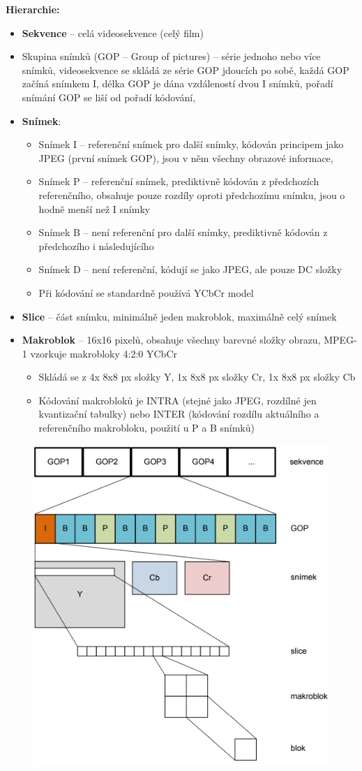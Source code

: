\textbf{Hierarchie:} \vspace{-4mm}
\begin{itemize}
    \item \textbf{Sekvence} – celá videosekvence (celý film)
 \item Skupina snímků (GOP – Group of pictures) – série jednoho nebo více snímků, videosekvence se skládá ze série GOP
jdoucích po sobě, každá GOP začíná snímkem I, délka GOP je dána vzdáleností dvou I snímků, pořadí snímání GOP
se liší od pořadí kódování,
 \item \textbf{Snímek}:
 \begin{itemize}
     \item Snímek I – referenční snímek pro další snímky, kódován principem jako JPEG (první snímek GOP), jsou v něm
všechny obrazové informace,
\item Snímek P – referenční snímek, prediktivně kódován z předchozích referenčního, obsahuje pouze rozdíly oproti
předchozímu snímku, jsou o hodně menší než I snímky
\item Snímek B – není referenční pro další snímky, prediktivně kódován z předchozího i následujícího
\item Snímek D – není referenční, kódují se jako JPEG, ale pouze DC složky
\item Při kódování se standardně používá YCbCr model
 \end{itemize}
 \item \textbf{Slice} – část snímku, minimálně jeden makroblok, maximálně celý snímek
 \item \textbf{Makroblok} – 16x16 pixelů, obsahuje všechny barevné složky obrazu, MPEG-1 vzorkuje makrobloky 4:2:0 YCbCr
 \begin{itemize}
     \item Skládá se z 4x 8x8 px složky Y, 1x 8x8 px složky Cr, 1x 8x8 px složky Cb
\item Kódování makrobloků je INTRA (stejné jako JPEG, rozdílné jen kvantizační tabulky) nebo INTER (kódování rozdílu
aktuálního a referenčního makrobloku, použití u P a B snímků)
 \end{itemize}
\end{itemize}

\begin{figure}[ht]
    \centering
    \includegraphics[width=0.5\linewidth]{images/mpeg.png}
\end{figure}
\FloatBarrier

